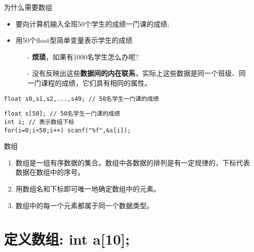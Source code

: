 
\begin{frame}{为什么需要数组}
\begin{itemize}
	\item 要向计算机输入全班50个学生的成绩一门课的成绩; 
	\item 用50个float型简单变量表示学生的成绩
	\begin{itemize}
		\item[-] \textbf{烦琐}，如果有1000名学生怎么办呢?
		\item[-] 没有反映出这些\textbf{数据间的内在联系}，实际上这些数据是同一个班级、同一门课程的成绩，它们具有相同的属性。
	\end{itemize}
\end{itemize}
\begin{lstlisting}
float s0,s1,s2,...,s49; // 50名学生一门课的成绩
\end{lstlisting}
\pause
\begin{lstlisting}
float s[50]; // 50名学生一门课的成绩
int i; // 表示数组下标
for(i=0;i<50;i++) scanf("%f",&s[i]);
\end{lstlisting}
\begin{block}{数组}
	\begin{enumerate}
		\item 数组是一组有序数据的集合。数组中各数据的排列是有一定规律的，下标代表数据在数组中的序号。
		\item 用数组名和下标即可唯一地确定数组中的元素。
		\item 数组中的每一个元素都属于同一个数据类型。
	\end{enumerate}
\end{block}
\end{frame}

\section{定义数组: int a[10];}

